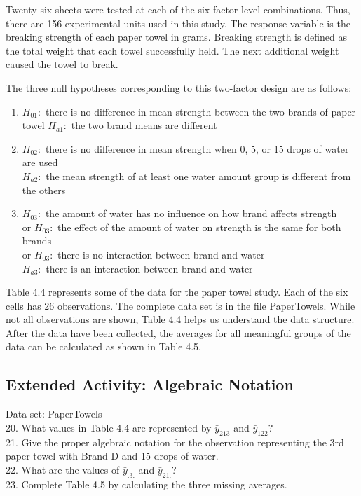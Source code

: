 \documentclass[
]{report}
\theoremstyle{definition}
\theoremstyle{definition}
\theoremstyle{definition}
\theoremstyle{definition}
\theoremstyle{remark}
\begin{document}
Twenty-six sheets were tested at each of the six factor-level combinations. Thus, there are 156 experimental
units used in this study. The response variable is the breaking strength of each paper towel in grams. Breaking
strength is defined as the total weight that each towel successfully held. The next additional weight caused
the towel to break.

The three null hypotheses corresponding to this two-factor design are as follows:

\begin{enumerate}
\def\labelenumi{\arabic{enumi}.}
\item
  \(H_{01}:\) there is no difference in mean strength between the two brands of paper towel
  \(H_{a1}:\) the two brand means are different
\item
  \(H_{02}:\) there is no difference in mean strength when 0, 5, or 15 drops of water are used\\
  \(H_{a2}:\) the mean strength of at least one water amount group is different from the others
\item
  \(H_{03}:\) the amount of water has no influence on how brand affects strength\\
  or \(H_{03}:\) the effect of the amount of water on strength is the same for both brands\\
  or \(H_{03}:\) there is no interaction between brand and water\\
  \(H_{a3}:\) there is an interaction between brand and water
\end{enumerate}

Table 4.4 represents some of the data for the paper towel study. Each of the six cells has 26 observations.
The complete data set is in the file PaperTowels. While not all observations are shown, Table 4.4 helps us
understand the data structure. After the data have been collected, the averages for all meaningful groups of
the data can be calculated as shown in Table 4.5.

\hypertarget{extended-activity-algebraic-notation}{%
\subsection{Extended Activity: Algebraic Notation}\label{extended-activity-algebraic-notation}}

Data set: PaperTowels\\
20. What values in Table 4.4 are represented by \(\bar y_{213}\) and \(\bar y_{122}\)?\\
21. Give the proper algebraic notation for the observation representing the 3rd paper towel with Brand D and 15 drops of water.\\
22. What are the values of \(\bar y_{.3.}\) and \(\bar y_{21.}\)?\\
23. Complete Table 4.5 by calculating the three missing averages.
\end{document}

